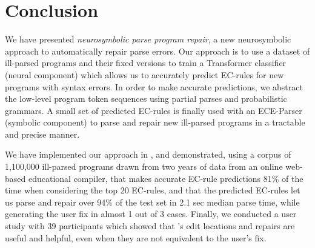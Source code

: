 \section{Conclusion}
\label{sec:conclusion}

We have presented \emph{neurosymbolic parse program repair}, a new neurosymbolic
approach to automatically repair parse errors.
%
Our approach is to use a dataset of ill-parsed programs and their fixed versions
to train a Transformer classifier (neural component) which allows us to
accurately predict EC-rules for new programs with syntax errors. In order to
make accurate predictions, we abstract the low-level program token sequences
using partial parses and probabilistic grammars. A small set of predicted
EC-rules is finally used with an ECE-Parser (symbolic component) to parse and
repair new ill-parsed programs in a tractable and precise manner.

We have implemented our approach in \toolname, and demonstrated, using a corpus
of 1,100,000 ill-parsed \python programs drawn from two years of data from an
online web-based educational compiler, that \toolname makes accurate EC-rule
predictions 81\% of the time when considering the top 20 EC-rules, and that the
predicted EC-rules let us parse and repair over 94\% of the test set in 2.1 sec
median parse time, while generating the user fix in almost 1 out of 3 cases.
%
Finally, we conducted a user study with 39 participants which showed that
\toolname's edit locations and repairs are useful and helpful, even when they
are not equivalent to the user's fix.
